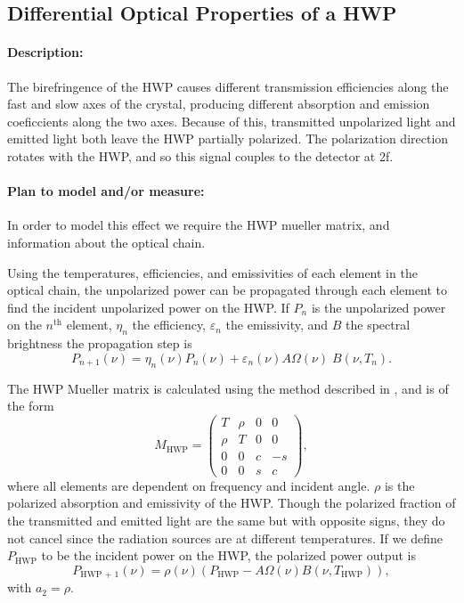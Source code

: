 
\subsection{Differential Optical Properties of a HWP}
\label{HWP Differential Optical Properties}

\paragraph{Description:}
The birefringence of the HWP causes different transmission efficiencies along the fast and slow axes of the crystal,
producing different absorption and emission coeficcients along the two axes.
Because of this, transmitted unpolarized light and emitted light both leave the HWP partially polarized.
The polarization direction rotates with the HWP, and so this signal couples to the detector at 2f.


\paragraph{Plan to model and/or measure:}
In order to model this effect we require the HWP mueller matrix, and information about the optical chain.

Using the temperatures, efficiencies, and emissivities of each element in the optical chain,
the unpolarized power can be propagated through each element to find the incident unpolarized power on the HWP.
If $P_n$ is the unpolarized power on the $n^\text{th}$ element, $\eta_n$ the efficiency, $\varepsilon_n$ the emissivity, and $B$ the spectral brightness
the propagation step is 
\begin{equation}
\label{unpolarized_propagation}
P_{n+1}(\nu) = \eta_n(\nu) P_n(\nu) + \varepsilon_n(\nu) A\Omega(\nu)\;  B(\nu, T_n) .
\end{equation}


The HWP Mueller matrix is calculated using the method described in \cite{Salatino16}, and is of the form
\[
M_\text{HWP} = \left(
\begin{array}{cccc}
T & \rho & 0 & 0\\
\rho & T & 0 & 0\\
0 & 0 & c & -s \\
0 & 0 & s & c
\end{array}
\right),
\]
where all elements are dependent on frequency and incident angle.
$\rho$ is the polarized absorption and emissivity of the HWP.
Though the polarized fraction of the transmitted and emitted light are the same but with opposite signs,
they do not cancel since the radiation sources are at different temperatures.
If we define $P_\text{HWP}$ to be the incident power on the HWP, the polarized power output is 
\begin{equation}
\label{eq:polarized_output}
P_\text{HWP + 1}(\nu) = \rho(\nu)(P_\text{HWP} - A\Omega(\nu)B(\nu, T_\text{HWP})),
\end{equation}
with $a_2 = \rho$. 

